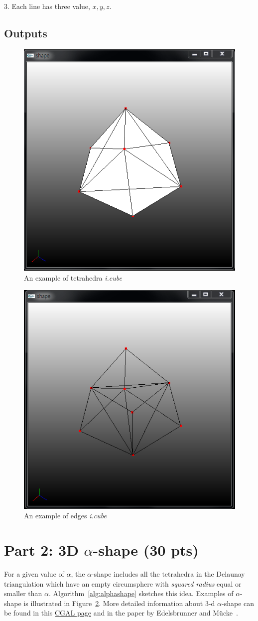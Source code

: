 \documentclass[11pt]{article}
\begin{document}
3. Each line has three value, $x, y, z$.

\subsection{Outputs}

\begin{figure}[h]

\includegraphics[width=.5\textwidth]{FIGS/icube-tetra}
\caption{An example of tetrahedra \textit{i.cube}}
\label{alg:alpha}
\end{figure}

\begin{figure}[h]
\centering
\includegraphics[width=.5\textwidth]{FIGS/icube-edges}
\caption{An example of edges \textit{i.cube}}
\label{alg:alpha}
\end{figure}




\section{Part 2: 3D $\alpha$-shape (30 pts)}


For a given value of $\alpha$, 
the $\alpha$-shape includes all the tetrahedra in the Delaunay triangulation which have an empty circumsphere with {\em squared radius} equal or smaller than $\alpha$.
Algorithm~\ref{alg:alphashape} sketches this idea. Examples of $\alpha$-shape is illustrated in Figure~\ref{alg:alpha}.
More detailed information about 3-d  $\alpha$-shape can be found in this 
\href{http://www.cgal.org/Manual/latest/doc_html/cgal_manual/Alpha_shapes_3/Chapter_main.html}{CGAL page} and in
the paper by Edelsbrunner and M\"{u}cke~\cite{em-tdas-94}.
\end{document}

